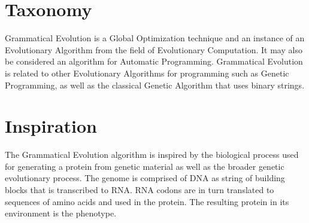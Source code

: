 \documentclass[a4paper, 11pt]{article}
\begin{document}
\section{Taxonomy}
\label{sec:taxonomy}
Grammatical Evolution is a Global Optimization technique and an instance of an Evolutionary Algorithm from the field of Evolutionary Computation. It may also be considered an algorithm for Automatic Programming.
Grammatical Evolution is related to other Evolutionary Algorithms for programming such as Genetic Programming, as well as the classical Genetic Algorithm that uses binary strings.

\section{Inspiration}
\label{sec:inspiration}
The Grammatical Evolution algorithm is inspired by the biological process used for generating a protein from genetic material as well as the broader genetic evolutionary process.
The genome is comprised of DNA as string of building blocks that is transcribed to RNA. RNA codons are in turn translated to sequences of amino acids and used in the protein. The resulting protein in its environment is the phenotype. 
\end{document}
